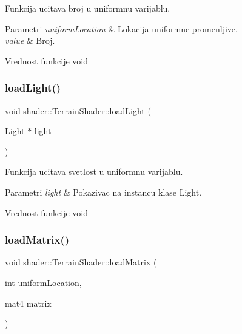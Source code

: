 Funkcija ucitava broj u uniformnu varijablu. 


\begin{DoxyParams}{Parametri}
{\em uniform\+Location} & Lokacija uniformne promenljive. \\
\hline
{\em value} & Broj. \\
\hline
\end{DoxyParams}
\begin{DoxyReturn}{Vrednost funkcije}
void 
\end{DoxyReturn}
\mbox{\label{classshader_1_1TerrainShader_a4c45561760ed2142804589352a820acd}} 
\subsubsection{\texorpdfstring{load\+Light()}{loadLight()}}
{\footnotesize\ttfamily void shader\+::\+Terrain\+Shader\+::load\+Light (\begin{DoxyParamCaption}\item[{\hyperlink{classentity_1_1Light}{Light} $\ast$}]{light }\end{DoxyParamCaption})}



Funkcija ucitava svetlost u uniformnu varijablu. 


\begin{DoxyParams}{Parametri}
{\em light} & Pokazivac na instancu klase Light. \\
\hline
\end{DoxyParams}
\begin{DoxyReturn}{Vrednost funkcije}
void 
\end{DoxyReturn}
\mbox{\label{classshader_1_1TerrainShader_a855daf1b36bc119a554caf0465c52400}} 
\subsubsection{\texorpdfstring{load\+Matrix()}{loadMatrix()}}
{\footnotesize\ttfamily void shader\+::\+Terrain\+Shader\+::load\+Matrix (\begin{DoxyParamCaption}\item[{int}]{uniform\+Location,  }\item[{mat4}]{matrix }\end{DoxyParamCaption})}



